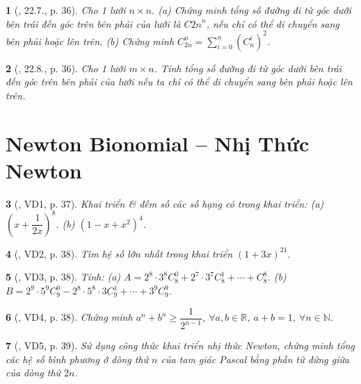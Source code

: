 \documentclass{article}
\newtheorem{baitoan}{}
\begin{document}
\begin{baitoan}[\cite{Hai_Hung_Thu_Tung_ncpt_Toan_10_tap_2}, 22.7., p. 36]
	Cho 1 lưới $n\times n$. (a) Chứng minh tổng số đường đi từ góc dưới bên trái đến góc trên bên phải của lưới là $C{2n}^n$, nếu chỉ có thể di chuyển sang bên phải hoặc lên trên. (b) Chứng minh $C_{2n}^n = \sum_{i=0}^n (C_n^i)^2$.
\end{baitoan}

\begin{baitoan}[\cite{Hai_Hung_Thu_Tung_ncpt_Toan_10_tap_2}, 22.8., p. 36]
	Cho 1 lưới $m\times n$. Tính tổng số đường đi từ góc dưới bên trái đến góc trên bên phải của lưới nếu ta chỉ có thể di chuyển sang bên phải hoặc lên trên.
\end{baitoan}


\section{Newton Bionomial -- Nhị Thức Newton}

\begin{baitoan}[\cite{Hai_Hung_Thu_Tung_ncpt_Toan_10_tap_2}, VD1, p. 37]
	Khai triển \& đếm số các số hạng có trong khai triển: (a) $\left(x + \dfrac{1}{2x}\right)^8$. (b) $(1 - x + x^2)^4$.
\end{baitoan}

\begin{baitoan}[\cite{Hai_Hung_Thu_Tung_ncpt_Toan_10_tap_2}, VD2, p. 38]
	Tìm hệ số lớn nhất trong khai triển $(1 + 3x)^{21}$.
\end{baitoan}

\begin{baitoan}[\cite{Hai_Hung_Thu_Tung_ncpt_Toan_10_tap_2}, VD3, p. 38]
	Tính: (a) $A = 2^8\cdot3^8C_8^0 + 2^7\cdot3^7C_8^1 + \cdots + C_8^8$. (b) $B = 2^9\cdot5^9C_9^0 - 2^8\cdot5^8\cdot3C_9^1 + \cdots + 3^9C_9^9$.
\end{baitoan}

\begin{baitoan}[\cite{Hai_Hung_Thu_Tung_ncpt_Toan_10_tap_2}, VD4, p. 38]
	Chứng minh $a^n + b^n\ge\dfrac{1}{2^{n-1}}$, $\forall a,b\in\mathbb{R}$, $a + b = 1$, $\forall n\in\mathbb{N}$.
\end{baitoan}

\begin{baitoan}[\cite{Hai_Hung_Thu_Tung_ncpt_Toan_10_tap_2}, VD5, p. 39]
	Sử dụng công thức khai triển nhị thức Newton, chứng minh tổng các hệ số bình phương ở dòng thứ $n$ của tam giác Pascal bằng phần tử đứng giữa của dòng thứ $2n$.
\end{baitoan}
\end{document}
